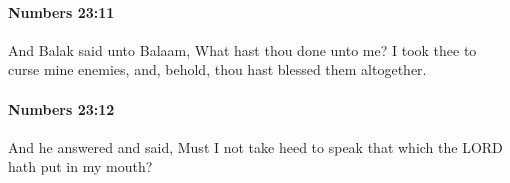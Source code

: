		\paragraph{Numbers 23:11} %
			\label{NUMBERS-23-11}

			And Balak said unto Balaam, What hast thou done unto me? I took thee to curse mine enemies, and, behold, thou hast blessed them altogether.


		\paragraph{Numbers 23:12} %
			\label{NUMBERS-23-12}

			And he answered and said, Must I not take heed to speak that which the LORD hath put in my mouth?


